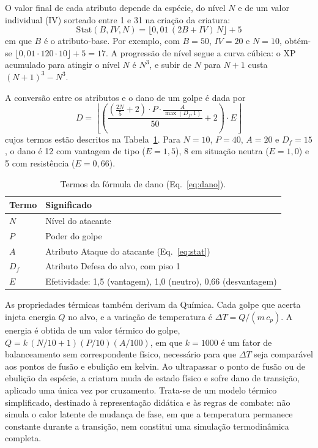 O valor final de cada atributo depende da espécie, do nível $N$ e de um valor individual (IV) sorteado entre 1 e 31 na criação da criatura:
\begin{equation}
\mathrm{Stat}(B,IV,N)=\lfloor 0{,}01\,(2B+IV)\,N\rfloor+5
\label{eq:stat}
\end{equation}
em que $B$ é o atributo-base. Por exemplo, com $B=50$, $IV=20$ e $N=10$, obtém-se $\lfloor 0{,}01\cdot 120\cdot 10\rfloor+5=17$. A progressão de nível segue a curva cúbica: o XP acumulado para atingir o nível $N$ é $N^3$, e subir de $N$ para $N+1$ custa $(N+1)^3-N^3$.

A conversão entre os atributos e o dano de um golpe é dada por
\begin{equation}
D=\left\lfloor\left(\frac{\left(\frac{2N}{5}+2\right)\cdot P\cdot \frac{A}{\max(D_f,1)}}{50}+2\right)\cdot E\right\rfloor
\label{eq:dano}
\end{equation}
cujos termos estão descritos na Tabela~\ref{tab:termos}. Para $N=10$, $P=40$, $A=20$ e $D_f=15$, o dano é 12 com vantagem de tipo ($E=1{,}5$), 8 em situação neutra ($E=1{,}0$) e 5 com resistência ($E=0{,}66$).

\begin{table}[!h]
\caption{Termos da fórmula de dano (Eq.~\ref{eq:dano}).}
\label{tab:termos}
\centering
\footnotesize
\begin{tabular}{@{}p{0.8cm}p{6.8cm}@{}}
\hline
\textbf{Termo} & \textbf{Significado} \\
\hline
$N$ & Nível do atacante \\
$P$ & Poder do golpe \\
$A$ & Atributo Ataque do atacante (Eq.~\ref{eq:stat}) \\
$D_f$ & Atributo Defesa do alvo, com piso 1 \\
$E$ & Efetividade: 1,5 (vantagem), 1,0 (neutro), 0,66 (desvantagem) \\
\hline
\end{tabular}
\end{table}

As propriedades térmicas também derivam da Química. Cada golpe que acerta injeta energia $Q$ no alvo, e a variação de temperatura é $\Delta T=Q/(m\,c_p)$. A energia é obtida de um valor térmico do golpe, $Q=k\,(N/10+1)(P/10)(A/100)$, em que $k=1000$ é um fator de balanceamento sem correspondente físico, necessário para que $\Delta T$ seja comparável aos pontos de fusão e ebulição em kelvin. Ao ultrapassar o ponto de fusão ou de ebulição da espécie, a criatura muda de estado físico e sofre dano de transição, aplicado uma única vez por cruzamento. Trata-se de um modelo térmico simplificado, destinado à representação didática e às regras de combate: não simula o calor latente de mudança de fase, em que a temperatura permanece constante durante a transição, nem constitui uma simulação termodinâmica completa.

